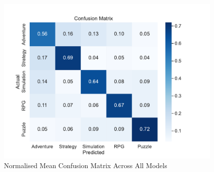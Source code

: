 \begin{figure}[!h]
    \centering
    \includegraphics[width=.9\textwidth]{data/results/plots/mean_confusion_matrix}
    \caption{Normalised Mean Confusion Matrix Across All Models}
    \label{fig:conf_mat_plot}
\end{figure}